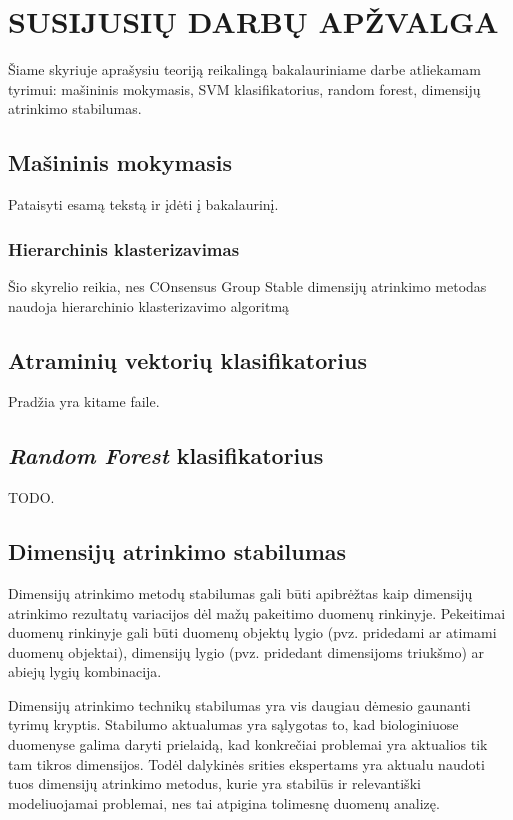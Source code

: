 \section{SUSIJUSIŲ DARBŲ APŽVALGA}
\label{darbu_apzvalga}

Šiame skyriuje aprašysiu teoriją reikalingą bakalauriniame darbe atliekamam tyrimui: mašininis mokymasis, SVM klasifikatorius, random forest, dimensijų atrinkimo stabilumas.

\subsection{Mašininis mokymasis}

Pataisyti esamą tekstą ir įdėti į bakalaurinį.

\subsubsection{Hierarchinis klasterizavimas}

Šio skyrelio reikia, nes COnsensus Group Stable dimensijų atrinkimo metodas naudoja hierarchinio klasterizavimo algoritmą

\subsection{Atraminių vektorių klasifikatorius}

Pradžia yra kitame faile.

\subsection{\textit{Random Forest} klasifikatorius}

TODO.

\subsection{Dimensijų atrinkimo stabilumas}

Dimensijų atrinkimo metodų stabilumas gali būti apibrėžtas kaip dimensijų atrinkimo rezultatų variacijos dėl mažų pakeitimo duomenų rinkinyje. Pekeitimai duomenų rinkinyje gali būti duomenų objektų lygio (pvz. pridedami ar atimami duomenų objektai), dimensijų lygio (pvz. pridedant dimensijoms triukšmo) ar abiejų lygių kombinacija.

Dimensijų atrinkimo technikų stabilumas yra vis daugiau dėmesio gaunanti tyrimų kryptis. Stabilumo aktualumas yra sąlygotas to, kad biologiniuose duomenyse galima daryti prielaidą, kad konkrečiai problemai yra aktualios tik tam tikros dimensijos. Todėl dalykinės srities ekspertams yra aktualu naudoti tuos dimensijų atrinkimo metodus, kurie yra stabilūs ir relevantiški modeliuojamai problemai, nes tai atpigina tolimesnę duomenų analizę. 

